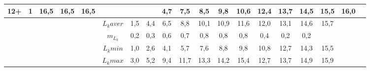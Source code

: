 \begin{landscape}
\begin{table}[h]
\begin{tabular}{|c|c|cc|cc|ccccccccccccc|}
12+     & 1  & 16,5  & 16,5  & 16,5    &         &     &     & 4,7 & 7,5  & 8,5  & 9,8  & 10,6 & 12,4 & 13,7 & 14,5 & 15,5 & 16,0 &  \\ \hline
        &    &       &       &         & $L_k aver$ & 1,5 & 4,4 & 6,5 & 8,8  & 10,1 & 10,9 & 11,6 & 12,0 & 13,1 & 14,6 & 15,7 &      &  \\
        &    &       &       &         & $m_{L_k}$  & 0,2 & 0,3 & 0,6 & 0,7  & 0,8  & 0,8  & 0,8  & 0,4  & 0,2  & 0,2  &      &      &  \\
        &    &       &       &         & $L_k min$  & 1,0 & 2,6 & 4,1 & 5,7  & 7,6  & 8,8  & 9,8  & 10,8 & 12,7 & 14,3 & 15,5 &      &  \\
        &    &       &       &         & $L_k max$  & 3,0 & 5,2 & 9,4 & 11,7 & 13,3 & 14,2 & 15,4 & 12,7 & 13,7 & 14,9 & 15,9 &      &  \\ \hline
\end{tabular}
\end{table}


\end{landscape}
